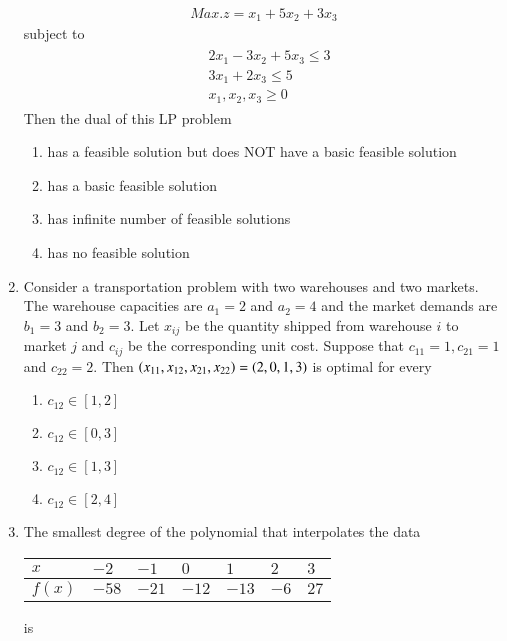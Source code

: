 \documentclass[journal]{IEEEtran}
\begin{document}
\begin{enumerate}
		\begin{align*}
		Max. z=x_{1}+5 x_{2}+3 x_{3}
		\end{align*}
subject to
             \begin{align*}
		\begin{aligned}
& 2 x_{1}-3 x_{2}+5 x_{3} \leq 3 \\
& 3 x_{1}+2 x_{3} \leq 5 \\
& x_{1}, x_{2}, x_{3} \geq 0
\end{aligned}
             \end{align*}
	 Then the dual of this LP problem
		\begin{enumerate}
			\item has a feasible solution but does NOT have a basic feasible solution
			\item has a basic feasible solution
			\item has infinite number of feasible solutions
			\item has no feasible solution
        	\end{enumerate}
	\item Consider a transportation problem with two warehouses and two markets. The warehouse capacities are $a_{1}=2$ and $a_{2}=4$ and the market demands are $b_{1}=3$ and $b_{2}=3$. Let $x_{i j}$ be the quantity shipped from warehouse $i$ to market $j$ and $c_{i j}$ be the corresponding unit cost. Suppose that $c_{11}=1, c_{21}=1$ and $c_{22}=2$. Then $\left(x_{11}, x_{12}, x_{21}, x_{22}\right)=(2,0,1,3)$ is optimal for every
		\begin{enumerate}
			\item $c_{12} \in[1,2]$
			\item $c_{12} \in[0,3]$
	         	\item $c_{12} \in[1,3]$
                 	\item $c_{12} \in[2,4]$
	\end{enumerate}	
    \item The smallest degree of the polynomial that interpolates the data
     \begin{tabular}{|l|l|l|l|l|l|l|}
     \hline$x$ & $-2$ & $-1$ & $0$ & $1$ & $2$ & $3$ \\
     \hline$f(x)$ & $-58$ & $-21$ & $-12$ & $-13$ & $-6$ &$ 27$ \\
     \hline
\end{tabular}
is
      \begin{enumerate}
\end{enumerate}
\end{enumerate}
\end{document}
